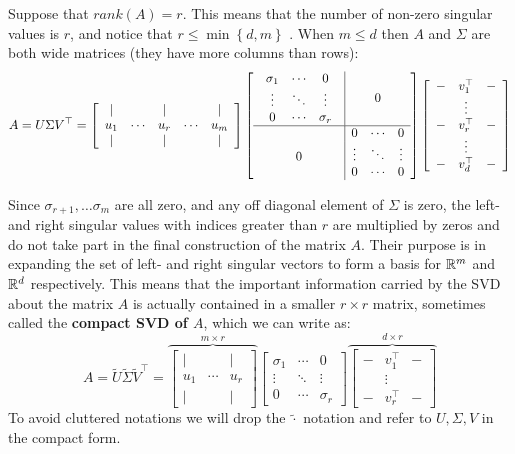 Suppose that $rank\left(A\right)=r$. This means that the number of non-zero singular values is $r$, and notice that $r\le\min\left\{ d,m\right\}$ . When $m\le d$ then $A$ and $\Sigma$ are both wide matrices (they have more columns than rows):
$$
A=U\Sigma V^{\top}=\left[\begin{array}{ccccc}
| &  & | &  & |\\
u_{1} & \cdots & u_{r} & \cdots & u_{m}\\
| &  & | &  & |
\end{array}\right]\left[\begin{array}{c|ccc}
\begin{array}{ccc}
\sigma_{1} & \cdots & 0\\
\vdots & \ddots & \vdots\\
0 & \cdots & \sigma_{r}
\end{array} &  & 0\\
\hline  & 0 & \cdots & 0\\
0 & \vdots & \ddots & \vdots\\
& 0 & \cdots & 0
\end{array}\right]\left[\begin{array}{ccc}
- & v_{1}^{\top} & -\\
& \vdots\\
- & v_{r}^{\top} & -\\
& \vdots\\
- & v_{d}^{\top} & -
\end{array}\right]
$$

Since $\sigma_{r+1},\ldots \sigma_m$ are all zero, and any off diagonal element of $\Sigma$ is zero, the left- and right singular values with indices greater than $r$ are multiplied by zeros and do not take part in the final construction of the matrix $A$. Their purpose is in expanding the set of left- and right singular vectors to form a basis for $\mathbb{R}^m$ and $\mathbb{R}^d$ respectively. This means that the important information carried by the SVD about the matrix $A$ is actually contained in a smaller $r\times r$ matrix, sometimes called the \textbf{compact SVD of $A$}, which we can write as:
$$
A=\tilde{U}\tilde{\Sigma}\tilde{V}^{\top}=\overset{m\times r}{\overbrace{\left[\begin{array}{ccc}
		| &  & |\\
		u_{1} & \cdots & u_{r}\\
		| &  & |
		\end{array}\right]}}\left[\begin{array}{ccc}
\sigma_{1} & \cdots & 0\\
\vdots & \ddots & \vdots\\
0 & \cdots & \sigma_{r}
\end{array}\right]\overset{d\times r}{\overbrace{\left[\begin{array}{ccc}
		- & v_{1}^{\top} & -\\
		& \vdots\\
		- & v_{r}^{\top} & -
		\end{array}\right]}}
$$
To avoid cluttered notations we will drop the $\widetilde{\cdot}$ notation and refer to $U,\Sigma,V$ in the compact form.


